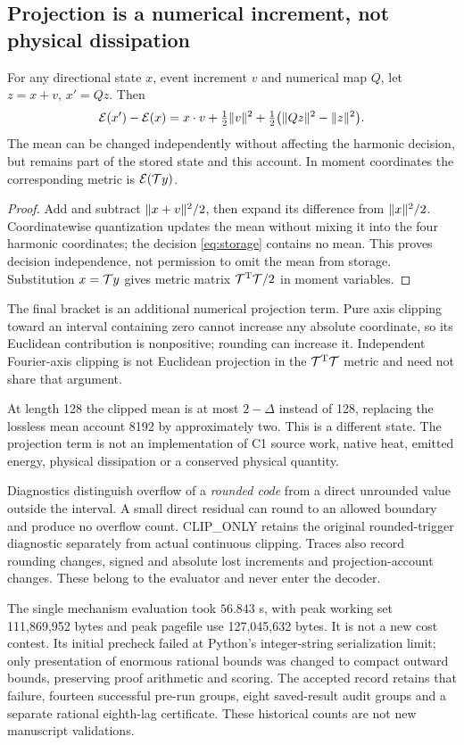 \subsection{Projection is a numerical increment, not physical dissipation}
\begin{proposition}\label{prop:projection}
For any directional state $x$, event increment $v$ and numerical map $Q$, let $z=x+v$, $x'=Qz$. Then
\begin{equation}\label{eq:projection}
 \mathcal E(x')-\mathcal E(x)=x\cdot v+\tfrac12\lVert v\rVert^2
              +\tfrac12\bigl(\lVert Qz\rVert^2-\lVert z\rVert^2\bigr).
\end{equation}
The mean can be changed independently without affecting the harmonic decision, but remains part of the stored state and this account. In moment coordinates the corresponding metric is $\mathcal E(\mathcal T y)$.
\end{proposition}
\begin{proof}
Add and subtract $\lVert x+v\rVert^2/2$, then expand its difference from $\lVert x\rVert^2/2$. Coordinatewise quantization updates the mean without mixing it into the four harmonic coordinates; the decision \eqref{eq:storage} contains no mean. This proves decision independence, not permission to omit the mean from storage. Substitution $x=\mathcal T y$ gives metric matrix $\mathcal T^{\mathrm T}\mathcal T/2$ in moment variables.
\end{proof}
The final bracket is an additional numerical projection term. Pure axis clipping toward an interval containing zero cannot increase any absolute coordinate, so its Euclidean contribution is nonpositive; rounding can increase it. Independent Fourier-axis clipping is not Euclidean projection in the $\mathcal T^{\mathrm T}\mathcal T$ metric and need not share that argument.

At length 128 the clipped mean is at most $2-\Delta$ instead of 128, replacing the lossless mean account 8192 by approximately two. This is a different state. The projection term is not an implementation of C1 source work, native heat, emitted energy, physical dissipation or a conserved physical quantity.

Diagnostics distinguish overflow of a \emph{rounded code} from a direct unrounded value outside the interval. A small direct residual can round to an allowed boundary and produce no overflow count. CLIP\_ONLY retains the original rounded-trigger diagnostic separately from actual continuous clipping. Traces also record rounding changes, signed and absolute lost increments and projection-account changes. These belong to the evaluator and never enter the decoder.

The single mechanism evaluation took $56.843$ s, with peak working set 111,869,952 bytes and peak pagefile use 127,045,632 bytes. It is not a new cost contest. Its initial precheck failed at Python's integer-string serialization limit; only presentation of enormous rational bounds was changed to compact outward bounds, preserving proof arithmetic and scoring. The accepted record retains that failure, fourteen successful pre-run groups, eight saved-result audit groups and a separate rational eighth-lag certificate. These historical counts are not new manuscript validations.
